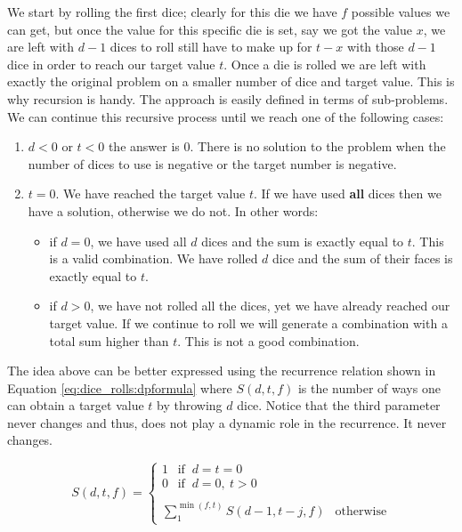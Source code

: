 We start by rolling the first dice; clearly for this die we have $f$ possible values we can get, but
once the value for this specific die is set, say we got the value $x$, we are left with $d-1$ dices
to roll still have to make up for $t-x$ with those $d-1$ dice in order to reach our target value
$t$. Once a die is rolled we are left with exactly the original problem on a smaller number of dice
and target value. This is why recursion is handy. The approach is easily defined in terms of
sub-problems. We can continue this recursive process until we reach one of the following cases:
\begin{enumerate}
	\item $d<0$ or $t<0$ the answer is $0$. There is no solution to the problem when the number of
	dices to use is negative or the target number is negative.
	\item $t=0$. We have reached the target value $t$. If we have used \textbf{all} dices then we
	have a solution, otherwise we do not. In other words:
	\begin{itemize}
		\item if $d=0$, we have used all $d$ dices and the sum is exactly equal to $t$. This is a
		valid combination. We have rolled $d$ dice and the sum of their faces is exactly equal to
		$t$.
		\item if $d>0$, we have not rolled all the dices, yet we have already reached our target
		value. If we continue to roll we will generate a combination with a total sum higher than
		$t$. This is not a good combination.
	\end{itemize}
\end{enumerate}
The idea above can be better expressed using the recurrence relation shown in Equation
\ref{eq:dice_rolls:dpformula} where $S(d,t,f)$ is the number of ways one can obtain a target value
$t$ by throwing $d$ dice. Notice that the third parameter never changes and thus, does not play a
dynamic role in the recurrence. It never changes. 

\begin{equation}
	S(d,t,f)=\begin{cases}
		 1 \: \: \text{ if } \: d=t=0 \\
		 0 \: \: \text{ if } \: d=0, \: t>0 \\ \\
		\sum_{1}^{\min(f,t)} S(d-1,t-j,f)  \:\: \text{ otherwise}
	 \end{cases}
	\label{eq:dice_rolls:dpformula}
\end{equation}

